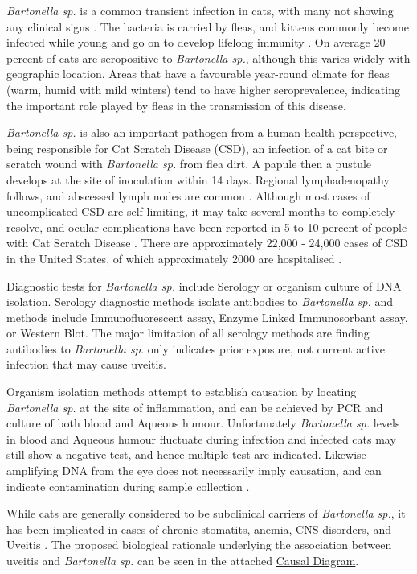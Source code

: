 \documentclass[11pt,twocolumn]{article}
\begin{document}
		\emph{Bartonella sp.} is a common transient infection in cats, with many not showing any clinical signs \cite{Guptill2010}. 
		The bacteria is carried by fleas, and kittens commonly become infected while young and go on to develop lifelong immunity \cite{Brunt2006}.
		On average 20 percent of cats are seropositive to \emph{Bartonella sp.}, although this varies widely with geographic location\cite{Jameson1995a}. Areas that have a favourable year-round climate for fleas (warm, humid with mild winters) tend to have higher seroprevalence, indicating the important role played by fleas in the transmission of this disease.


		\emph{Bartonella sp.} is also an important pathogen from a human health perspective, being responsible for Cat Scratch Disease (CSD), an infection of a cat bite or scratch wound with \emph{Bartonella sp.} from flea dirt. 
		A papule then a pustule develops at the site of inoculation within 14 days. Regional lymphadenopathy follows, and abscessed lymph nodes are common \cite{Brunt2006}. 
		Although most cases of uncomplicated CSD are self-limiting, it may take several months to completely resolve, and ocular complications have been reported in 5 to 10 percent of people with Cat Scratch Disease \cite{Wade2000}.
		There are approximately 22,000 - 24,000 cases of CSD in the United States, of which approximately 2000 are hospitalised \cite{Jackson1993}.
	
		Diagnostic tests for \emph{Bartonella sp.} include Serology or organism culture of DNA isolation.
		Serology diagnostic methods isolate antibodies to \emph{Bartonella sp.} and methods include Immunofluorescent assay, Enzyme Linked Immunosorbant assay, or Western Blot. 
		The major limitation of all serology methods are finding antibodies to \emph{Bartonella sp.} only indicates prior exposure, not current active infection that may cause uveitis.


		Organism isolation methods attempt to establish causation by locating \emph{Bartonella sp.} at the site of inflammation, and can be achieved by PCR and culture of both blood and Aqueous humour. 
		Unfortunately \emph{Bartonella sp.} levels in blood and Aqueous humour fluctuate during infection and infected cats may still show a negative test, and hence multiple test are indicated\cite{Guptill2010}. 
		Likewise amplifying DNA from the eye does not necessarily imply causation, and can indicate contamination during sample collection \cite{Powell2010}.
		

		While cats are generally considered to be subclinical carriers of \emph{Bartonella sp.}, it has been implicated in cases of chronic stomatits, anemia, CNS disorders, and Uveitis \cite{Nasir2005}.
		The proposed biological rationale underlying the association between uveitis and \emph{Bartonella sp.} can be seen in the attached \hyperref[fig:1]{Causal Diagram}.
\end{document}
